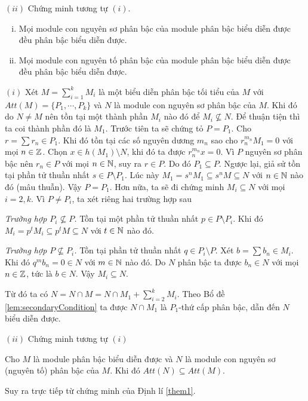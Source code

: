 \noindent
$(ii)$ Chứng minh tương tự $(i)$.

\begin{theorem}\quad\vspace{-6pt}
    \label{them1}
    \begin{enumerate}[(i)]
        \item Mọi module con nguyên sơ phân bậc của module phân bậc biểu diễn được đều phân bậc biểu diễn được.
        \item Mọi module con nguyên tố phân bậc của module phân bậc biểu diễn được đều phân bậc biểu diễn được.
    \end{enumerate}
\end{theorem}
\startproof $(i)$ Xét $M = \sum_{i=1}^k M_i$ là một biểu diễn phân bậc tối tiểu của $M$ với $Att(M)=\{P_1,\cdots,P_k\}$ và $N$ là module con nguyên sơ phân bậc của $M$. Khi đó do $N \neq M$ nên tồn tại một thành phần $M_i$ nào đó để $M_i \not\subseteq N$. Để thuận tiện thì ta coi thành phần đó là $M_1$. Trước tiên ta sẽ chứng tỏ $P = P_1$. Cho $r = \sum r_n \in P_1$. Khi đó tồn tại các số nguyên dương $m_n$ sao cho $r_n^{m_n}M_1 = 0$ với mọi $n \in \mathbb Z$. Chọn $x \in h(M_1) \setminus N$, khi đó ta được $r_n^{m_n}x = 0$. Vì $P$ nguyên sơ phân bậc nên $r_n \in P$ với mọi $n \in \mathbb N$, suy ra $r \in P$. Do đó $P_1 \subseteq P$. Ngược lại, giả sử tồn tại phần tử thuần nhất $s \in P \setminus P_1$. Lúc này $M_1 = s^nM_1 \subseteq s^nM \subseteq N$ với $n \in \mathbb N$ nào đó (mâu thuẫn). Vậy $P = P_1$. Hơn nữa, ta sẽ đi chứng minh $M_i \subseteq N$ với mọi $i=2,k$. Vì $P \neq P_i$, ta xét riêng hai trường hợp sau

\textit{Trường hợp $P_i \not\subseteq P$.} Tồn tại một phần tử thuần nhất $p \in P \setminus P_i$. Khi đó $M_i = p^tM_i \subseteq p^tM \subseteq N$ với $t \in \mathbb N$ nào đó.

\textit{Trường hợp $P \not\subseteq P_i$.} Tồn tại phần tử thuần nhất $q \in P_i \setminus P$. Xét $b = \sum b_n \in M_i$. Khi đó $q^mb_n = 0 \in N$ với $m \in \mathbb N$ nào đó. Do $N$ phân bậc ta được $b_n \in N$ với mọi $n \in \mathbb Z$, tức là $b \in N$. Vậy $M_i \subseteq N$.

Từ đó ta có $N = N \cap M = N \cap M_1 + \sum_{i=2}^k M_i$. Theo Bổ đề \ref{lem:secondaryCondition} ta được $N \cap M_1$ là $P_1$-thứ cấp phân bậc, dẫn đến $N$ biểu diễn được.

\noindent
$(ii)$ Chứng minh tương tự $(i)$\QED

\begin{corollary}
    Cho $M$ là module phân bậc biểu diễn được và $N$ là module con nguyên sơ (nguyên tố) phân bậc của $M$. Khi đó $Att(N) \subseteq Att(M)$.
\end{corollary}
\startproof Suy ra trực tiếp từ chứng minh của Định lí \ref{them1}.

